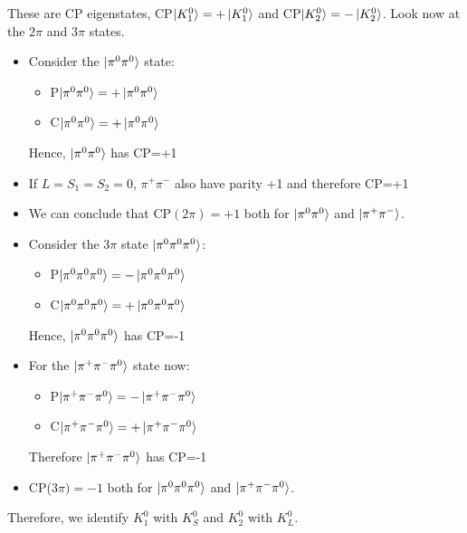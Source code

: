 \documentclass[10.75pt,a4paper,openright,bottom=2cm]{article}
\begin{document}
These are CP eigenstates, CP$\ket{K_1^0}=+\ket{K_1^0}$ and CP$\ket{K_2^0}=-\ket{K_2^0}$. Look now at the $2\pi$ and $3\pi$ states.
\begin{multicols}{2}
\begin{itemize}
    \item Consider the $\ket{\pi^0\pi^0}$ state:
    \begin{itemize}
        \item P$\ket{\pi^0\pi^0}=+\ket{\pi^0\pi^0}$
        \item C$\ket{\pi^0\pi^0}=+\ket{\pi^0\pi^0}$
    \end{itemize}
    Hence, $\ket{\pi^0\pi^0}$ has CP=+1
    \item If $L=S_1=S_2=0$, $\pi^+\pi^-$ also have parity +1 and therefore CP=+1
    \item We can conclude that CP$(2\pi)=+1$ both for $\ket{\pi^0\pi^0}$ and $\ket{\pi^+\pi^-}$.
\end{itemize}
\columnbreak
\begin{itemize}
    \item Consider the $3\pi$ state $\ket{\pi^0\pi^0\pi^0}$:
    \begin{itemize}
        \item P$\ket{\pi^0\pi^0\pi^0}=-\ket{\pi^0\pi^0\pi^0}$
        \item C$\ket{\pi^0\pi^0\pi^0}=+\ket{\pi^0\pi^0\pi^0}$
    \end{itemize}
    Hence, $\ket{\pi^0\pi^0\pi^0}$ has CP=-1
    \item For the $\ket{\pi^+\pi^-\pi^0}$ state now:
    \begin{itemize}
        \item P$\ket{\pi^+\pi^-\pi^0}=-\ket{\pi^+\pi^-\pi^0}$
        \item C$\ket{\pi^+\pi^-\pi^0}=+\ket{\pi^+\pi^-\pi^0}$
    \end{itemize}
    Therefore $\ket{\pi^+\pi^-\pi^0}$ has CP=-1
    \item CP($3\pi)=-1$ both for $\ket{\pi^0\pi^0\pi^0}$ and $\ket{\pi^+\pi^-\pi^0}$.
\end{itemize}
\end{multicols}
Therefore, we identify $K_1^0$ with $K_S^0$ and $K_2^0$ with $K_L^0$.
\end{document}
